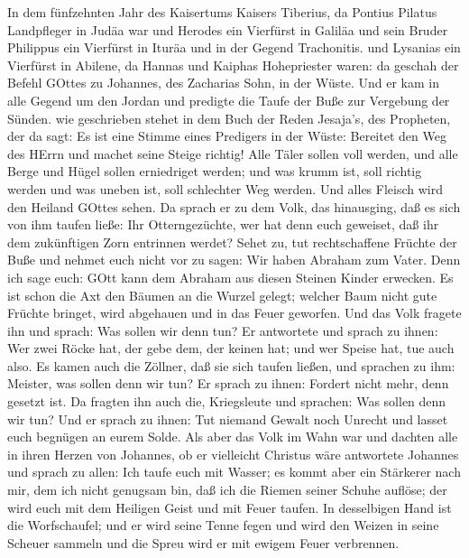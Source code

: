 In dem fünfzehnten Jahr des Kaisertums Kaisers Tiberius, da
Pontius Pilatus Landpfleger in Judäa war und Herodes ein Vierfürst in
Galiläa und sein Bruder Philippus ein Vierfürst in Ituräa und in der
Gegend Trachonitis. und Lysanias ein Vierfürst in Abilene, 
da Hannas und Kaiphas Hohepriester waren: da geschah der Befehl GOttes
zu Johannes, des Zacharias Sohn, in der Wüste.  Und er kam
in alle Gegend um den Jordan und predigte die Taufe der Buße zur
Vergebung der Sünden.  wie geschrieben stehet in dem Buch
der Reden Jesaja's, des Propheten, der da sagt: Es ist eine Stimme eines
Predigers in der Wüste: Bereitet den Weg des HErrn und machet seine
Steige richtig!  Alle Täler sollen voll werden, und alle
Berge und Hügel sollen erniedriget werden; und was krumm ist, soll
richtig werden und was uneben ist, soll schlechter Weg werden.
 Und alles Fleisch wird den Heiland GOttes sehen.
 Da sprach er zu dem Volk, das hinausging, daß es sich von
ihm taufen ließe: Ihr Otterngezüchte, wer hat denn euch geweiset, daß
ihr dem zukünftigen Zorn entrinnen werdet?  Sehet zu, tut
rechtschaffene Früchte der Buße und nehmet euch nicht vor zu sagen: Wir
haben Abraham zum Vater. Denn ich sage euch: GOtt kann dem Abraham aus
diesen Steinen Kinder erwecken.  Es ist schon die Axt den
Bäumen an die Wurzel gelegt; welcher Baum nicht gute Früchte bringet,
wird abgehauen und in das Feuer geworfen.  Und das Volk
fragete ihn und sprach: Was sollen wir denn tun?  Er
antwortete und sprach zu ihnen: Wer zwei Röcke hat, der gebe dem, der
keinen hat; und wer Speise hat, tue auch also.  Es kamen
auch die Zöllner, daß sie sich taufen ließen, und sprachen zu ihm:
Meister, was sollen denn wir tun?  Er sprach zu ihnen:
Fordert nicht mehr, denn gesetzt ist.  Da fragten ihn auch
die, Kriegsleute und sprachen: Was sollen denn wir tun? Und er sprach zu
ihnen: Tut niemand Gewalt noch Unrecht und lasset euch begnügen an eurem
Solde.  Als aber das Volk im Wahn war und dachten alle in
ihren Herzen von Johannes, ob er vielleicht Christus wäre 
antwortete Johannes und sprach zu allen: Ich taufe euch mit Wasser; es
kommt aber ein Stärkerer nach mir, dem ich nicht genugsam bin, daß ich
die Riemen seiner Schuhe auflöse; der wird euch mit dem Heiligen Geist
und mit Feuer taufen.  In desselbigen Hand ist die
Worfschaufel; und er wird seine Tenne fegen und wird den Weizen in seine
Scheuer sammeln und die Spreu wird er mit ewigem Feuer verbrennen.
